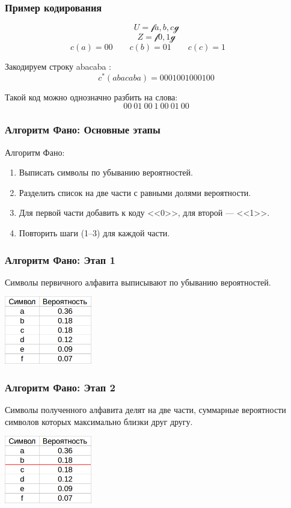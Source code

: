 \documentclass[10pt,pdf,hyperref={unicode}]{beamer}
\begin{document}
\begin{frame}
	\frametitle{Пример кодирования}
	$$
		U = \mathcal {f} a, b, c \mathcal {g}
	$$$$
		Z = \mathcal {f} 0, 1 \mathcal {g}
	$$$$
		c(a) = 00 \qquad
		c(b) = 01 \qquad
		c(c) = 1 \qquad
	$$

	Закодируем строку abacaba :
	$$
		c^*(abacaba) = 0001001000100
	$$

	Такой код можно однозначно разбить на слова:
	$$
		00\ 01\ 00\ 1\ 00\ 01\ 00
	$$
\end{frame}

\begin{frame}
	\frametitle{Алгоритм Фано: Основные этапы}
	Алгоритм Фано:
	\begin{enumerate}
		\item Выписать символы по убыванию вероятностей.
		\item Разделить список на две части с равными долями вероятности.
		\item Для первой части добавить к коду <<0>>, для второй --- <<1>>.
		\item Повторить шаги (1--3) для каждой части.
	\end{enumerate}
\end{frame}


\begin{frame}
	\frametitle{Алгоритм Фано: Этап 1}
	Символы первичного алфавита выписывают по убыванию вероятностей.
	\newline\newline
	\centerline{\includegraphics[height=8em]{alg0.png}}
\end{frame}

\begin{frame}
	\frametitle{Алгоритм Фано: Этап 2}
	Символы полученного алфавита делят на две части, суммарные вероятности символов которых максимально близки друг другу.
	\newline\newline
	\centerline{\includegraphics[height=8em]{alg1.png}}
\end{frame}
\end{document}
